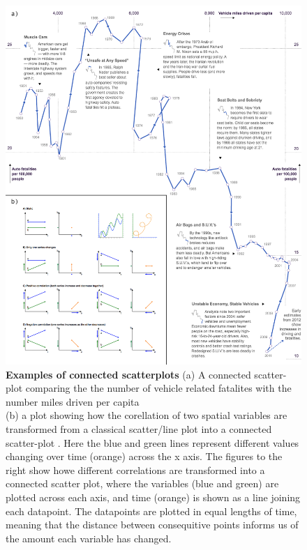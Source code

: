 \begin{figure}[H]
     \centering
         \includegraphics[width=1.1\textwidth]{figures_c1/connectedscatter.png}
        \caption{\textbf{Examples of connected scatterplots} (a) A connected scatter-plot comparing the the number of vehicle related fatalites with the number miles driven per capita \citep{conscat}\\
        (b) a plot showing how the corellation of two spatial variables are transformed from a classical scatter/line plot into a connected scatter-plot \citep{defconscat}. Here the blue and green lines represent different values changing over time (orange) across the x axis. The figures to the right show howe different correlations are transformed into a connected scatter plot, where the variables (blue and green) are plotted across each axis, and time (orange) is shown as a line joining each datapoint. The datapoints are plotted in equal lengths of time, meaning that the distance between consequitive points informs us of the amount each variable has changed.}
        \label{fig:conscat}
\end{figure}
\newpage




